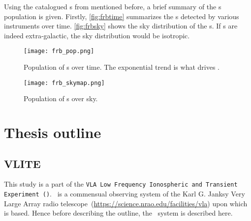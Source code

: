 \par Using the catalogued \frb{}s from  mentioned before, a brief summary of the \frb{}s population is given.
Firstly, \autoref{fig:frbtime} summarizes the \frb{}s detected by various instruments over time. \autoref{fig:frbsky} shows the sky distribution of the \frb{}s.
If \frb{}s are indeed extra-galactic, the sky distribution would be isotropic.

\begin{figure}
	\label{fig:frbtime}
	\centering
	\texttt{[image: frb\_pop.png]}
	\caption{Population of \frb{}s over time. The exponential trend is what drives \vf.}
\end{figure}

\begin{figure}
	\label{fig:frbsky}
	\centering
	\texttt{[image: frb\_skymap.png]}
	\caption{Population of \frb{}s over sky. }
\end{figure}




\section{Thesis outline}

\subsection{VLITE}

\par This study is a part of the \texttt{VLA Low Frequency Ionospheric and Transient Experiment (\vlite)}. 
\vlite~is a commensual observing system of the Karl G. Janksy Very Large Array radio telescope~(\url{https://science.nrao.edu/facilities/vla}) upon which \vf is based. 
Hence before describing the outline, the \vlite~system is described here.

